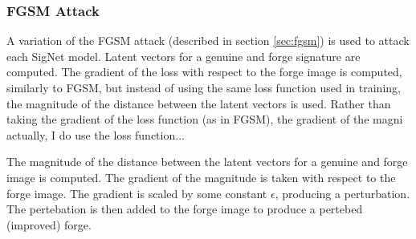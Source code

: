 



\subsubsection{FGSM Attack}
A variation of the FGSM attack (described in section \ref{sec:fgsm}) is used to attack each SigNet model.
Latent vectors for a genuine and forge signature are computed.
The gradient of the loss with respect to the forge image is computed, similarly to FGSM, but instead of using the same loss function used in training, the magnitude of the distance between the latent vectors is used.
Rather than taking the gradient of the loss function (as in FGSM), the gradient of the magni
    actually, I do use the loss function...

The magnitude of the distance between the latent vectors for a genuine and forge image is computed.
The gradient of the magnitude is taken with respect to the forge image.
The gradient is scaled by some constant $\epsilon$, producing a perturbation.
The pertebation is then added to the forge image to produce a pertebed (improved) forge.

